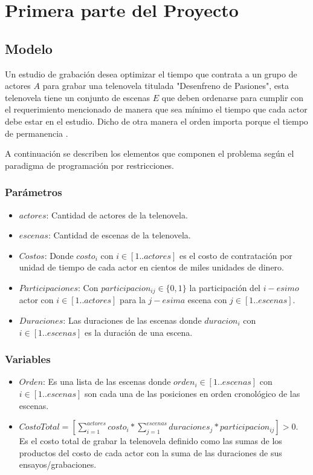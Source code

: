 \documentclass{article}
\begin{document}

\section{Primera parte del Proyecto}
\subsection{Modelo}
Un estudio de grabación desea optimizar el tiempo que contrata a un grupo de actores $A$ para grabar una telenovela titulada "Desenfreno de Pasiones", esta telenovela tiene un conjunto de escenas $E$ que deben ordenarse para cumplir con el requerimiento mencionado de manera que sea mínimo el tiempo que cada actor debe estar en el estudio. Dicho de otra manera el orden importa porque el tiempo de permanencia . \newline

A continuación se describen los elementos que componen el problema según el paradigma de programación por restricciones.

\subsubsection{Parámetros}
\begin{itemize}
    \item $actores$: Cantidad de actores de la telenovela.
    \item $escenas$: Cantidad de escenas de la telenovela.
    \item $Costos$: Donde $costo_i$ con $i \in [1..actores]$ es el costo de contratación por unidad de tiempo de cada actor en cientos de miles unidades de dinero.
    \item $Participaciones$: Con $participacion_{ij} \in \{0,1\}$ la participación del $i-esimo$ actor con $i \in [1..actores]$ para la $j-esima$ escena con $j \in [1..escenas]$.
    \item $Duraciones$: Las duraciones de las escenas donde $duracion_i$ con $i \in [1..escenas]$ es la duración de una escena.
\end{itemize}

\subsubsection{Variables}
\begin{itemize}
    \item $Orden$: Es una lista de las escenas donde $orden_i \in [1..escenas]$ con $i \in [1..escenas]$ son cada una de las posiciones en orden cronológico de las escenas.
    \item $CostoTotal = [\sum_{i=1}^{actores} costo_i * \sum_{j=1}^{escenas}duraciones_j * participacion_{ij} ]   > 0$. \newline\newline  
    Es el costo total de grabar la telenovela definido como las sumas de los productos del costo de cada actor con la suma de las duraciones de sus ensayos/grabaciones.    
\end{itemize}
\end{document}
